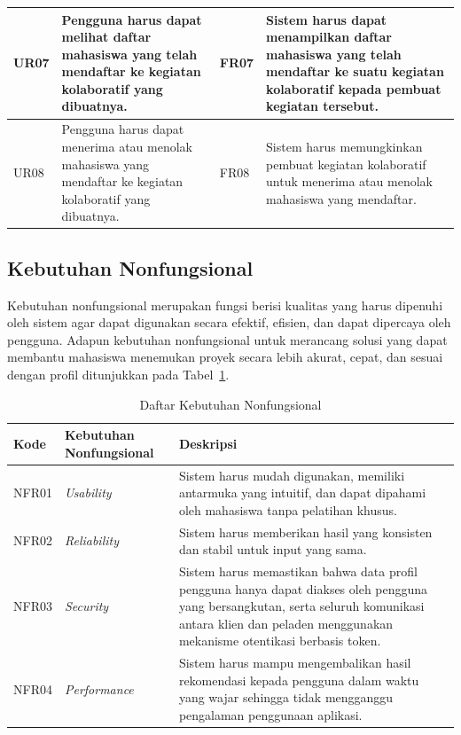 \begin{longtable}{p{1.5cm} p{4cm} p{1.5cm} p{\dimexpr\linewidth-7cm-8\tabcolsep\relax}}
    \midrule
  UR07 & Pengguna harus dapat melihat daftar mahasiswa yang telah mendaftar ke kegiatan kolaboratif yang dibuatnya. & FR07 & Sistem harus dapat menampilkan daftar mahasiswa yang telah mendaftar ke suatu kegiatan kolaboratif kepada pembuat kegiatan tersebut. \\
    \midrule
  UR08 & Pengguna harus dapat menerima atau menolak mahasiswa yang mendaftar ke kegiatan kolaboratif yang dibuatnya. & FR08 & Sistem harus memungkinkan pembuat kegiatan kolaboratif untuk menerima atau menolak mahasiswa yang mendaftar. \\
\end{longtable}

\subsection{Kebutuhan Nonfungsional}

Kebutuhan nonfungsional merupakan fungsi berisi kualitas yang harus dipenuhi oleh sistem agar dapat digunakan secara efektif, efisien, dan dapat dipercaya oleh pengguna. Adapun kebutuhan nonfungsional untuk merancang solusi yang dapat membantu mahasiswa menemukan proyek secara lebih akurat, cepat, dan sesuai dengan profil ditunjukkan pada Tabel~\ref{tab:kebutuhan-nonfungsional}.

\begin{table}[H]
  \caption{Daftar Kebutuhan Nonfungsional}
  \label{tab:kebutuhan-nonfungsional}
  \begin{tabularx}{\textwidth}{p{1.5cm} p{3cm} X}
    \toprule
    \textbf{Kode} & \textbf{Kebutuhan Nonfungsional} & \textbf{Deskripsi} \\
    \midrule
    NFR01 & \emph{Usability} & Sistem harus mudah digunakan, memiliki antarmuka yang intuitif, dan dapat dipahami oleh mahasiswa tanpa pelatihan khusus. \\
    \midrule
    NFR02 & \emph{Reliability} & Sistem harus memberikan hasil yang konsisten dan stabil untuk input yang sama. \\
    \midrule
    NFR03 & \emph{Security} & Sistem harus memastikan bahwa data profil pengguna hanya dapat diakses oleh pengguna yang bersangkutan, serta seluruh komunikasi antara klien dan peladen menggunakan mekanisme otentikasi berbasis token. \\
    \midrule
    NFR04 & \emph{Performance} & Sistem harus mampu mengembalikan hasil rekomendasi kepada pengguna dalam waktu yang wajar sehingga tidak mengganggu pengalaman penggunaan aplikasi. \\
    \bottomrule
  \end{tabularx}
\end{table}

